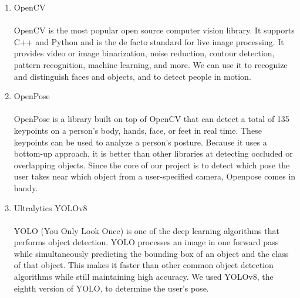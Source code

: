 \begin{enumerate}[label=\arabic*]
\begin{enumerate}[label=\alph*.]
            \item OpenCV\\
            \\
            OpenCV is the most popular open source computer vision library. It supports C++ and Python and is the de facto standard for live image processing. It provides video or image binarization, noise reduction, contour detection, pattern recognition, machine learning, and more. We can use it to recognize and distinguish faces and objects, and to detect people in motion. \\

            \item OpenPose\\
            \\
            OpenPose is a library built on top of OpenCV that can detect a total of 135 keypoints on a person's body, hands, face, or feet in real time. These keypoints can be used to analyze a person's posture. Because it uses a bottom-up approach, it is better than other libraries at detecting occluded or overlapping objects. Since the core of our project is to detect which pose the user takes near which object from a user-specified camera, Openpose comes in handy.\\

            \item Ultralytics YOLOv8\\
            \\YOLO (You Only Look Once) is one of the deep learning algorithms that performs object detection. YOLO processes an image in one forward pass while simultaneously predicting the bounding box of an object and the class of that object. This makes it faster than other common object detection algorithms while still maintaining high accuracy. We used YOLOv8, the eighth version of YOLO, to determine the user's pose.\\
        \end{enumerate}
        

\end{enumerate}
